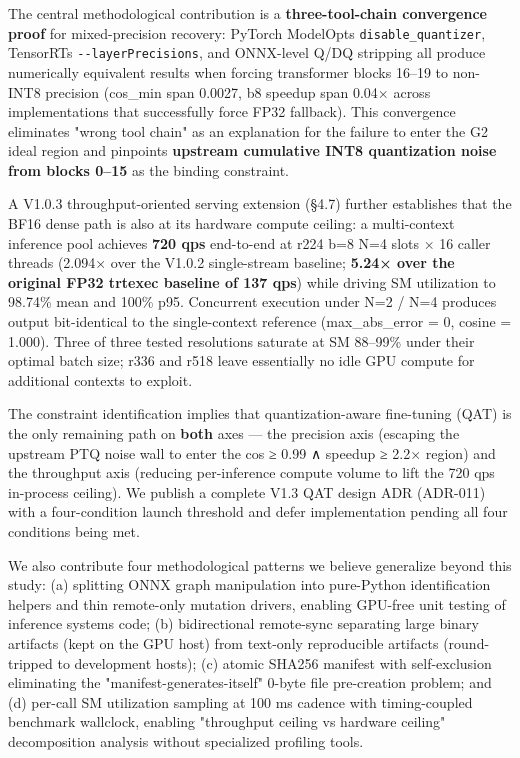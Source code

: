 \documentclass[
]{article}
\begin{document}
The central methodological contribution is a \textbf{three-tool-chain
convergence proof} for mixed-precision recovery: PyTorch
ModelOpt\textquotesingle s \texttt{disable\_quantizer},
TensorRT\textquotesingle s \texttt{-\/-layerPrecisions}, and ONNX-level
Q/DQ stripping all produce numerically equivalent results when forcing
transformer blocks 16--19 to non-INT8 precision (cos\_min span 0.0027,
b8 speedup span 0.04× across implementations that successfully force
FP32 fallback). This convergence eliminates "wrong tool chain" as an
explanation for the failure to enter the G2 ideal region and pinpoints
\textbf{upstream cumulative INT8 quantization noise from blocks 0--15}
as the binding constraint.

A V1.0.3 throughput-oriented serving extension (§4.7) further
establishes that the BF16 dense path is also at its hardware compute
ceiling: a multi-context inference pool achieves \textbf{720 qps}
end-to-end at r224 b=8 N=4 slots × 16 caller threads (2.094× over the
V1.0.2 single-stream baseline; \textbf{5.24× over the original FP32
trtexec baseline of 137 qps}) while driving SM utilization to 98.74\%
mean and 100\% p95. Concurrent execution under N=2 / N=4 produces output
bit-identical to the single-context reference (max\_abs\_error = 0,
cosine = 1.000). Three of three tested resolutions saturate at SM
88--99\% under their optimal batch size; r336 and r518 leave essentially
no idle GPU compute for additional contexts to exploit.

The constraint identification implies that quantization-aware
fine-tuning (QAT) is the only remaining path on \textbf{both} axes ---
the precision axis (escaping the upstream PTQ noise wall to enter the
cos ≥ 0.99 ∧ speedup ≥ 2.2× region) and the throughput axis (reducing
per-inference compute volume to lift the 720 qps in-process ceiling). We
publish a complete V1.3 QAT design ADR (ADR-011) with a four-condition
launch threshold and defer implementation pending all four conditions
being met.

We also contribute four methodological patterns we believe generalize
beyond this study: (a) splitting ONNX graph manipulation into
pure-Python identification helpers and thin remote-only mutation
drivers, enabling GPU-free unit testing of inference systems code; (b)
bidirectional remote-sync separating large binary artifacts (kept on the
GPU host) from text-only reproducible artifacts (round-tripped to
development hosts); (c) atomic SHA256 manifest with self-exclusion
eliminating the "manifest-generates-itself" 0-byte file pre-creation
problem; and (d) per-call SM utilization sampling at 100 ms cadence with
timing-coupled benchmark wallclock, enabling "throughput ceiling vs
hardware ceiling" decomposition analysis without specialized profiling
tools.
\end{document}
